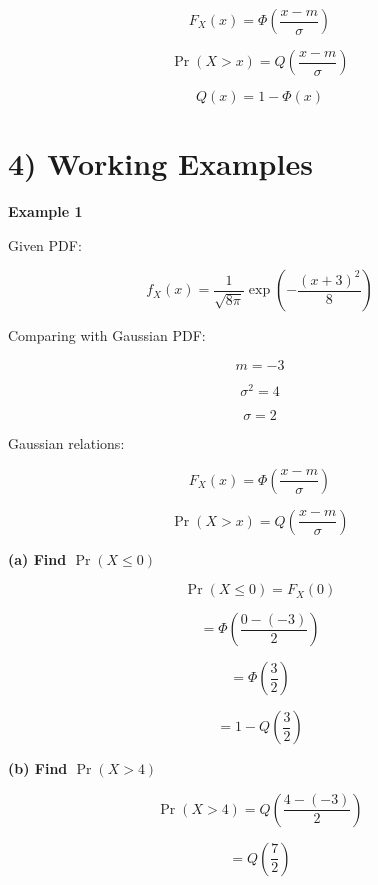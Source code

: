 \documentclass[12pt]{article}
\begin{document}
\[
F_X(x)
=
\Phi
\left(
\frac{x-m}{\sigma}
\right)
\]

\[
\Pr(X > x)
=
Q
\left(
\frac{x-m}{\sigma}
\right)
\]

\[
Q(x)
=
1 - \Phi(x)
\]

\section*{4) Working Examples}

\textbf{Example 1}

Given PDF:

\[
f_X(x)
=
\frac{1}{\sqrt{8\pi}}
\exp
\left(
-
\frac{(x+3)^2}{8}
\right)
\]

Comparing with Gaussian PDF:

\[
m = -3
\]

\[
\sigma^2 = 4
\]

\[
\sigma = 2
\]

Gaussian relations:

\[
F_X(x)
=
\Phi
\left(
\frac{x-m}{\sigma}
\right)
\]

\[
\Pr(X>x)
=
Q
\left(
\frac{x-m}{\sigma}
\right)
\]

\textbf{(a) Find $\Pr(X \le 0)$}

\[
\Pr(X \le 0)
=
F_X(0)
\]

\[
=
\Phi
\left(
\frac{0-(-3)}{2}
\right)
\]

\[
=
\Phi
\left(
\frac{3}{2}
\right)
\]

\[
=
1 -
Q
\left(
\frac{3}{2}
\right)
\]

\textbf{(b) Find $\Pr(X > 4)$}

\[
\Pr(X > 4)
=
Q
\left(
\frac{4-(-3)}{2}
\right)
\]

\[
=
Q
\left(
\frac{7}{2}
\right)
\]
\end{document}
